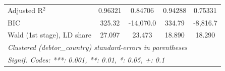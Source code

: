 \begin{table}[htbp]
\begin{tabular}{lcccc}
      Adjusted R$^2$                           & 0.96321                        & 0.84706                        & 0.94288                           & 0.75331\\  
      BIC                                      & 325.32                         & -14,070.0                      & 334.79                            & -8,816.7\\  
      Wald (1st stage), LD share               & 27.097                         & 23.473                         & 18.890                            & 18.290\\  
      \midrule \midrule
      \multicolumn{5}{l}{\emph{Clustered (debtor\_country) standard-errors in parentheses}}\\
      \multicolumn{5}{l}{\emph{Signif. Codes: ***: 0.001, **: 0.01, *: 0.05, +: 0.1}}\\
   \end{tabular}
\end{table}


